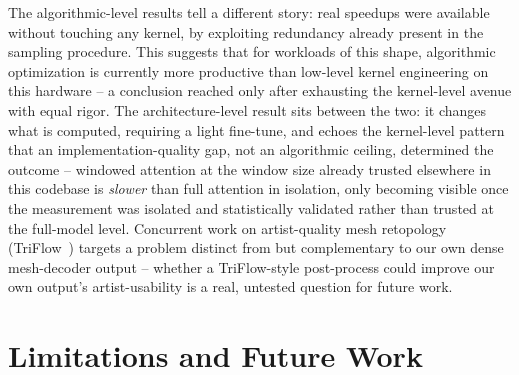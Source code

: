 \documentclass{article}
\begin{document}
The algorithmic-level results tell a different story: real speedups were available without
touching any kernel, by exploiting redundancy already present in the sampling procedure. This
suggests that for workloads of this shape, algorithmic optimization is currently more productive
than low-level kernel engineering on this hardware -- a conclusion reached only after exhausting
the kernel-level avenue with equal rigor. The architecture-level result sits between the two: it
changes what is computed, requiring a light fine-tune, and echoes the kernel-level pattern that an
implementation-quality gap, not an algorithmic ceiling, determined the outcome -- windowed
attention at the window size already trusted elsewhere in this codebase is \emph{slower} than full
attention in isolation, only becoming visible once the measurement was isolated and statistically
validated rather than trusted at the full-model level. Concurrent work on artist-quality mesh
retopology (TriFlow~\cite{triflow}) targets a problem distinct from but complementary to our own
dense mesh-decoder output -- whether a TriFlow-style post-process could improve our own output's
artist-usability is a real, untested question for future work.

\section{Limitations and Future Work}
\end{document}
